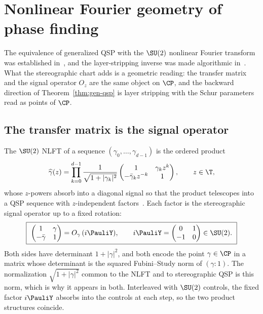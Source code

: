 \section{Nonlinear Fourier geometry of phase finding}
\label{sec:nlft}

The equivalence of generalized QSP with the $\SU(2)$ nonlinear
Fourier transform was established
in~\cite{AlexisMnatsakanyanThiele2024,AlexisBeckerEtAl2026,Laneve2025},
and the layer-stripping inverse was made
algorithmic in~\cite{NiSarkarYingLin2025}.  What the stereographic
chart adds is a geometric reading: the transfer matrix and the
signal operator $O_z$ are the same object on $\CP$, and the
backward direction of Theorem~\ref{thm:gen-qsp} is layer stripping
with the Schur parameters read as points of $\CP$.

\subsection{The transfer matrix is the signal operator}
\label{subsec:transfer}

The $\SU(2)$ NLFT of a sequence $(\gamma_0,\dots,\gamma_{d-1})$ is
the ordered product
\begin{equation}
	\widehat\gamma(z)=\prod_{k=0}^{d-1}
	\frac{1}{\sqrt{1+|\gamma_k|^2}}
	\begin{pmatrix} 1 & \gamma_k z^k\\ -\bar\gamma_k z^{-k} & 1
	\end{pmatrix},\qquad z\in\T,
	\label{eq:nlft}
\end{equation}
whose $z$-powers absorb into a diagonal signal so that the product
telescopes into a QSP sequence with $z$-independent
factors~\cite{Laneve2025}.  Each factor is the stereographic signal
operator up to a fixed rotation:
\begin{equation}
	\boxed{\ \begin{pmatrix} 1 & \gamma\\ -\bar\gamma & 1
	\end{pmatrix}=O_\gamma\,(i\PauliY),\qquad
	i\PauliY=\begin{pmatrix}0&1\\-1&0\end{pmatrix}\in\SU(2).\ }
	\label{eq:transfer-identity}
\end{equation}
Both sides have determinant $1+|\gamma|^2$, and both encode the
point $\gamma\in\CP$ in a matrix whose determinant is the squared
Fubini--Study norm of $(\gamma:1)$.  The normalization
$\sqrt{1+|\gamma|^2}$ common to the NLFT and to stereographic QSP
is this norm, which is why it appears in both.  Interleaved with
$\SU(2)$ controls, the fixed factor $i\PauliY$ absorbs into the
controls at each step, so the two product structures coincide.

